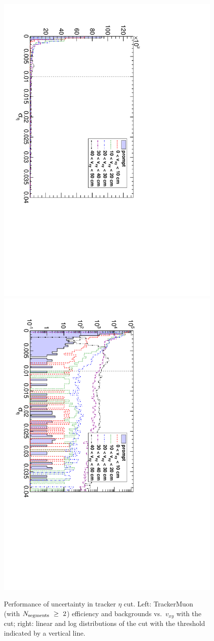 \documentclass[12pt]{article}
\newcommand{\s}[1]{{\mbox{\scriptsize #1}}}
\begin{document}
\begin{figure}
\begin{center}
\begin{multicols}{2}
\includegraphics[height=\linewidth, angle=90]{fig/backgrounds3_plot/trackslinear_etaerr.pdf}
\includegraphics[height=\linewidth, angle=90]{fig/backgrounds3_plot/trackslog_etaerr.pdf}
\end{multicols}

\caption{Performance of uncertainty in tracker $\eta$ cut.  Left: TrackerMuon (with $N_\s{segments}~\ge~2$) efficiency and backgrounds vs.\ $v_{xy}$ with the cut; right: linear and log distributions of the cut with the threshold indicated by a vertical line. \label{fig:etaerr}}
\end{center}
\end{figure}
\end{document}
